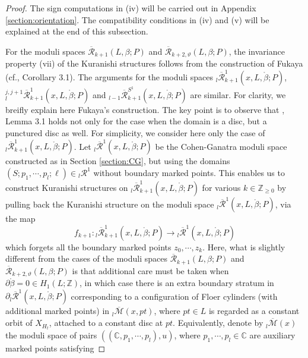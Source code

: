 \documentclass[a4paper]{article}
\numberwithin{equation}{section}
\begin{document}
\begin{proof}
The sign computations in (iv) will be carried out in Appendix \ref{section:orientation}. The compatibility conditions in (iv) and (v) will be explained at the end of this subsection.

For the moduli spaces $\overline{\mathcal{R}}_{k+1}(L,\beta;P)$ and $\overline{\mathcal{R}}_{k+2,\vartheta}(L,\beta;P)$, the invariance property (vii) of the Kuranishi structures follows from the construction of Fukaya (cf.\cite{kfc}, Corollary 3.1). The arguments for the moduli spaces ${}_l\overline{\mathcal{R}}_{k+1}^1(x,L,\ring{\beta};P)$, ${}_l^{j,j+1}\overline{\mathcal{R}}_{k+1}^1(x,L,\ring{\beta};P)$ and ${}_{l-1}\overline{\mathcal{R}}_{k+1}^{S^1}(x,L,\ring{\beta};P)$ are similar. For clarity, we breifly explain here Fukaya's construction. The key point is to observe that \cite{kfc}, Lemma 3.1 holds not only for the case when the domain is a disc, but a punctured disc as well. For simplicity, we consider here only the case of ${}_l\overline{\mathcal{R}}_{k+1}^1(x,L,\ring{\beta};P)$. Let ${}_l\overline{\mathcal{R}}^1(x,L,\ring{\beta};P)$ be the Cohen-Ganatra moduli space constructed as in Section \ref{section:CG}, but using the domains $(S;p_1,\cdots,p_l;\ell)\in{}_l\mathcal{R}^1$ without boundary marked points. This enables us to construct Kuranishi structures on ${}_l\overline{\mathcal{R}}_{k+1}^1(x,L,\ring{\beta};P)$ for various $k\in\mathbb{Z}_{\geq0}$ by pulling back the Kuranishi structure on the moduli space ${}_l\overline{\mathcal{R}}^1(x,L,\ring{\beta};P)$, via the map
\begin{equation}\label{eq:forget}
f_{k+1}:{}_l\overline{\mathcal{R}}_{k+1}^1(x,L,\ring{\beta};P)\rightarrow{}_l\overline{\mathcal{R}}^1(x,L,\ring{\beta};P)
\end{equation}
which forgets all the boundary marked points $z_0,\cdots,z_k$. Here, what is slightly different from the cases of the moduli spaces $\overline{\mathcal{R}}_{k+1}(L,\beta;P)$ and $\overline{\mathcal{R}}_{k+2,\vartheta}(L,\beta;P)$ is that additional care must be taken when $\partial\ring{\beta}=0\in H_1(L;\mathbb{Z})$, in which case there is an extra boundary stratum in $\partial{}_l\overline{\mathcal{R}}^1(x,L,\ring{\beta};P)$ corresponding to a configuration of Floer cylinders (with additional marked points) in ${}_l\overline{\mathcal{M}}(x,\mathit{pt})$, where $\mathit{pt}\in L$ is regarded as a constant orbit of $X_{H_t}$, attached to a constant disc at $\mathit{pt}$. Equivalently, denote by ${}_l\overline{\mathcal{M}}(x)$ the moduli space of pairs $\left((\mathbb{C},p_1,\cdots,p_l),u\right)$, where $p_1,\cdots,p_l\in\mathbb{C}$ are auxiliary marked points satisfying

\end{proof}
\end{document}
